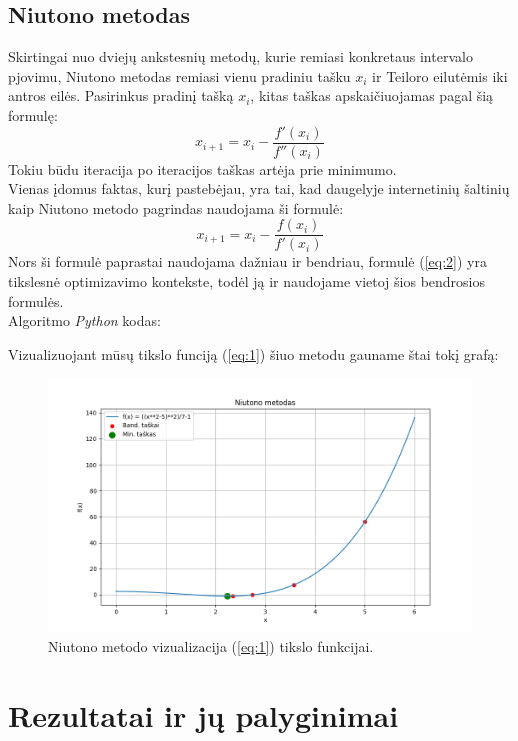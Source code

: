 \documentclass{article}
\begin{document}
\subsection{Niutono metodas}
Skirtingai nuo dviejų ankstesnių metodų, kurie remiasi konkretaus intervalo pjovimu, Niutono metodas remiasi vienu pradiniu tašku $x_{i}$ ir Teiloro eilutėmis iki antros eilės. Pasirinkus pradinį tašką $x_{i}$, kitas taškas apskaičiuojamas pagal šią formulę:
\begin{equation}\label{eq:2}
    x_{i+1} = x_{i} - \frac{f'(x_{i})}{f''(x_{i})}
\end{equation}
Tokiu būdu iteracija po iteracijos taškas artėja prie minimumo.\\
Vienas įdomus faktas, kurį pastebėjau, yra tai, kad daugelyje internetinių šaltinių kaip Niutono metodo pagrindas naudojama ši formulė:
\begin{equation*}
    x_{i+1} = x_{i} - \frac{f(x_{i})}{f'(x_{i})}
\end{equation*}
Nors ši formulė paprastai naudojama dažniau ir bendriau, formulė (\ref{eq:2}) yra tikslesnė optimizavimo kontekste, todėl ją ir naudojame vietoj šios bendrosios formulės.\\
Algoritmo \textit{Python} kodas:

Vizualizuojant mūsų tikslo funciją (\ref{eq:1}) šiuo metodu gauname štai tokį grafą:
\begin{figure}[H]
    \centering
    \includegraphics[width=1\textwidth]{Figure_3.png}
    \caption{Niutono metodo vizualizacija (\ref{eq:1}) tikslo funkcijai.}
    \label{fig:3}
\end{figure}
\section{Rezultatai ir jų palyginimai}
\end{document}
